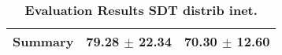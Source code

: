 \begin{table}[htb]
{\begin{tabular}{lll}
\midrule
\textbf{Summary                                  } &                  \phantom{0}79.28 $\pm$ 22.34 &                      \phantom{0}70.30 $\pm$ 12.60 \\
\bottomrule
\end{tabular}%
}
\caption{\textbf{Evaluation Results SDT distrib inet.}}
\label{tab:eval-results}
\end{table}
